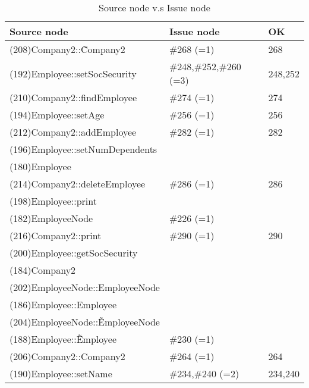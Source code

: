 \begin{table}[hb]
\begin{center}
\begin{tabular}{|l|l|l|}
\hline
Source node & Issue node  & OK\\
\hline
(208)Company2::\~Company2 & \#268 (=1) & 268\\
(192)Employee::setSocSecurity & \#248,\#252,\#260 (=3) & 248,252\\
(210)Company2::findEmployee & \#274 (=1) & 274\\
(194)Employee::setAge & \#256 (=1) & 256\\
(212)Company2::addEmployee & \#282 (=1) & 282\\
(196)Employee::setNumDependents &  & \\
(180)Employee &  & \\
(214)Company2::deleteEmployee & \#286 (=1) & 286\\
(198)Employee::print &  & \\
(182)EmployeeNode & \#226 (=1) & \\
(216)Company2::print & \#290 (=1) & 290\\
(200)Employee::getSocSecurity &  & \\
(184)Company2 &  & \\
(202)EmployeeNode::EmployeeNode &  & \\
(186)Employee::Employee &  & \\
(204)EmployeeNode::\~EmployeeNode &  & \\
(188)Employee::\~Employee & \#230 (=1) & \\
(206)Company2::Company2 & \#264 (=1) & 264\\
(190)Employee::setName & \#234,\#240 (=2) & 234,240\\
\hline
\end{tabular}
\caption{Source node v.s Issue node}
\end{center}
\end{table}

